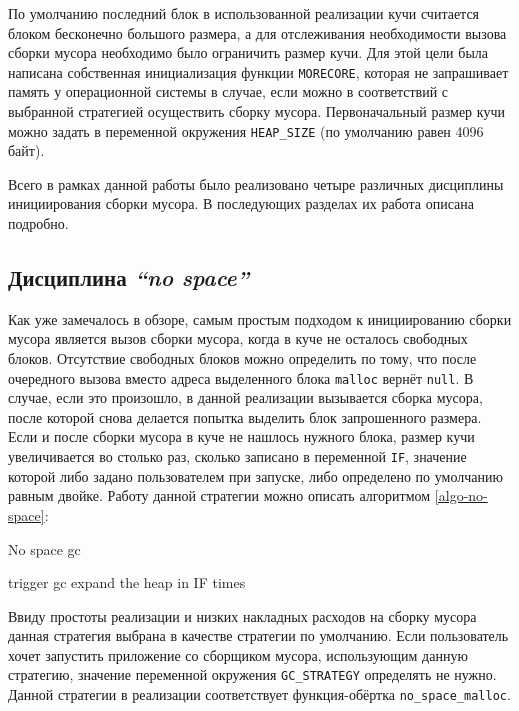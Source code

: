 По умолчанию последний блок в использованной реализации кучи считается блоком бесконечно
большого размера, а для отслеживания необходимости вызова сборки мусора
необходимо было ограничить размер кучи. Для этой цели была написана собственная инициализация
функции \texttt{MORECORE}, которая не запрашивает память у операционной системы в случае, если можно
в соответствий с выбранной стратегией осуществить сборку мусора. Первоначальный размер кучи можно задать
в переменной окружения \texttt{HEAP\_SIZE} (по умолчанию равен 4096 байт).

Всего в рамках данной работы было реализовано четыре различных дисциплины
инициирования сборки мусора. В последующих разделах их работа описана подробно.

\subsection{Дисциплина \emph{``no space''}}
Как уже замечалось в обзоре, самым простым подходом к инициированию
сборки мусора является вызов сборки мусора, когда в куче не осталось 
свободных блоков. Отсутствие свободных блоков можно определить по тому,
что после очередного вызова вместо адреса выделенного блока \texttt{malloc} вернёт
\texttt{null}. В случае, если это произошло, в данной реализации вызывается сборка мусора,
после которой снова делается попытка выделить блок запрошенного размера.
Если и после сборки мусора в куче не нашлось нужного блока, размер кучи
увеличивается во столько раз, сколько записано в переменной \texttt{IF},
значение которой либо задано пользователем при запуске, либо определено
по умолчанию равным двойке.
Работу данной стратегии можно описать алгоритмом \ref{algo-no-space}:


\begin{algorithm}[hbt]
\caption{No space gc}
\label{algo-no-space}
\begin{algorithmic}[3]
        \State trigger gc
            \State expand the heap in IF times
        \EndIf
\EndIf
\end{algorithmic}
\end{algorithm}

Ввиду простоты реализации и низких накладных расходов на сборку мусора
данная стратегия выбрана в качестве стратегии по умолчанию.
Если пользователь хочет запустить приложение со сборщиком мусора,
использующим данную стратегию, значение переменной окружения \texttt{GC\_STRATEGY}
определять не нужно. Данной стратегии в реализации соответствует 
функция-обёртка \texttt{no\_space\_malloc}.



